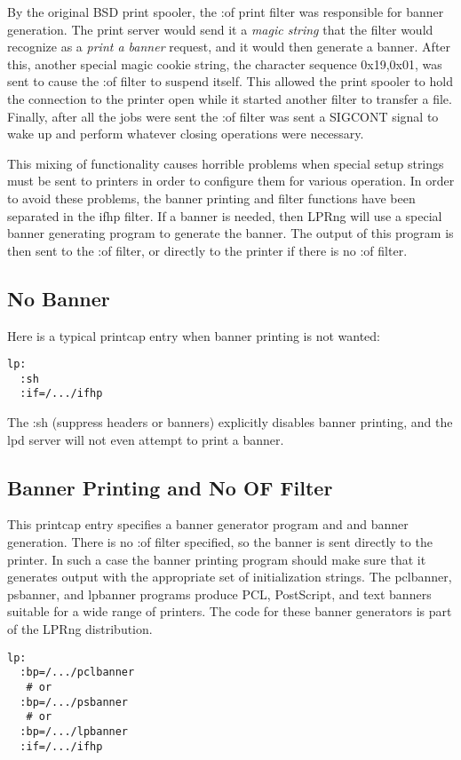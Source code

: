 \documentclass[a4paper]{article}
\begin{document}
By the original BSD print spooler,
the {\ttfamily :of} print filter was responsible for
banner generation.
The print server would send it a
{\itshape magic string\/} that the filter would recognize
as a {\itshape print a banner\/} request,
and it would then generate a banner.
After this,
another special {\ttfamily magic cookie} string,
the character sequence {\ttfamily 0x19,0x01},
was sent to cause the {\ttfamily :of} filter to suspend itself.
This allowed the print spooler to hold the connection to the printer
open while it started another filter to transfer a file.
Finally,
after all the jobs were sent the {\ttfamily :of} filter was
sent a {\ttfamily SIGCONT} signal to wake up and perform whatever
closing operations were necessary.

This mixing of functionality causes horrible problems when
special setup strings must be sent to printers in order to
configure them for various operation.
In order to avoid these problems,
the banner printing and filter functions have been separated in
the {\ttfamily ifhp} filter.
If a banner is needed,
then {\ttfamily LPRng} will use a special banner generating program
to generate the banner.
The output of this program is then sent to the
{\ttfamily :of} filter, or directly to the printer if there is no
{\ttfamily :of} filter.


\subsection{No Banner}

Here is a typical printcap entry when banner printing
is not wanted:
\begin{tscreen}
\begin{verbatim}
lp:
  :sh
  :if=/.../ifhp
\end{verbatim}
\end{tscreen}


The {\ttfamily :sh} (suppress headers or banners) explicitly disables
banner printing,
and the {\ttfamily lpd} server will not even attempt to print a banner.


\subsection{Banner Printing and No OF Filter}

This printcap entry specifies a banner generator program and
and banner generation.
There is no {\ttfamily :of} filter specified, so the banner is sent
directly to the printer.
In such a case the banner printing program should make sure that
it generates output with the appropriate set of initialization
strings.
The {\ttfamily pclbanner},
{\ttfamily psbanner},
and
{\ttfamily lpbanner}
programs produce PCL,
PostScript,
and text banners suitable for a wide range of printers.
The code for these banner generators is part of the LPRng distribution.
\begin{tscreen}
\begin{verbatim}
lp:
  :bp=/.../pclbanner
   # or
  :bp=/.../psbanner
   # or
  :bp=/.../lpbanner
  :if=/.../ifhp
\end{verbatim}
\end{tscreen}
\end{document}
